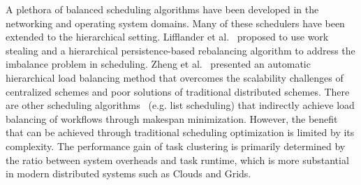 

A plethora of balanced scheduling algorithms have been developed in the networking and operating system domains. Many of these schedulers have been extended to the hierarchical setting. Lifflander et al.~\cite{Lifflander} proposed to use work stealing and a hierarchical persistence-based rebalancing algorithm to address the imbalance problem in scheduling. Zheng et al.~\cite{Zheng} presented an automatic hierarchical load balancing method that overcomes the scalability challenges of centralized schemes and poor solutions of traditional distributed schemes. There are other scheduling algorithms~\cite{Braun2001} (e.g. list scheduling) that indirectly achieve load balancing of workflows through makespan minimization. However, the benefit that can be achieved through traditional scheduling optimization is limited by its complexity. The performance gain of task clustering is primarily determined by the ratio between system overheads and task runtime, which is more substantial in modern distributed systems such as Clouds and Grids. 



